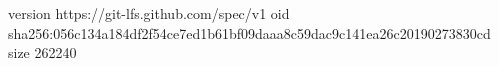 version https://git-lfs.github.com/spec/v1
oid sha256:056c134a184df2f54ce7ed1b61bf09daaa8c59dac9c141ea26c20190273830cd
size 262240
